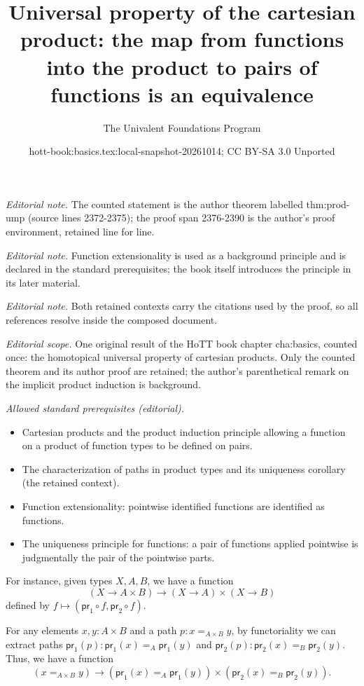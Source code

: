 \documentclass[10pt,a4paper]{article}
\title{Universal property of the cartesian product: the map from functions into the product to pairs of functions is an equivalence}
\author{The Univalent Foundations Program}
\date{hott-book:basics.tex:local-snapshot-20261014; CC BY-SA 3.0 Unported}
\newcounter{chapter}
\providecommand{\index}[1]{}
\newcommand{\proj}[1]{\ensuremath{\mathsf{pr}_{#1}}\xspace}
\newcommand{\id}[3][]{\ensuremath{#2 =_{#1} #3}\xspace}
\newcommand{\map}[2]{\ensuremath{{#1}\mathopen{}\left({#2}\right)\mathclose{}}\xspace}
\let\ap\map
\theoremstyle{definition}
\theoremstyle{remark}
\numberwithin{equation}{section}
\begin{document}
\maketitle
\noindent\textit{Editorial note.} The counted statement is the author theorem labelled thm:prod-ump (source lines 2372-2375); the proof span 2376-2390 is the author's proof environment, retained line for line.\par\medskip
\noindent\textit{Editorial note.} Function extensionality is used as a background principle and is declared in the standard prerequisites; the book itself introduces the principle in its later material.\par\medskip
\noindent\textit{Editorial note.} Both retained contexts carry the citations used by the proof, so all references resolve inside the composed document.\par\medskip
\noindent\textit{Editorial scope.} One original result of the HoTT book chapter cha:basics, counted once: the homotopical universal property of cartesian products. Only the counted theorem and its author proof are retained; the author's parenthetical remark on the implicit product induction is background.\par\medskip
\noindent\textit{Allowed standard prerequisites (editorial).}\begin{itemize}
\item Cartesian products and the product induction principle allowing a function on a product of function types to be defined on pairs.
\item The characterization of paths in product types and its uniqueness corollary (the retained context).
\item Function extensionality: pointwise identified functions are identified as functions.
\item The uniqueness principle for functions: a pair of functions applied pointwise is judgmentally the pair of the pointwise parts.
\end{itemize}\medskip
For instance, given types $X,A,B$, we have a function
\index{type!product}%
\begin{equation}\label{eq:prod-ump-map}
  (X\to A\times B) \to (X\to A)\times (X\to B)
\end{equation}
defined by $f \mapsto (\proj1 \circ f, \proj2\circ f)$.

For any elements $x,y:A\times B$ and a path $p:\id[A\times B]{x}{y}$, by functoriality we can extract paths $\ap{\proj1}p:\id[A]{\proj1(x)}{\proj1(y)}$ and $\ap{\proj2}p:\id[B]{\proj2(x)}{\proj2(y)}$.
Thus, we have a function
\begin{equation}\label{eq:path-prod}
  (\id[A\times B]{x}{y}) \to (\id[A]{\proj1(x)}{\proj1(y)}) \times (\id[B]{\proj2(x)}{\proj2(y)}).
\end{equation}
\end{document}
